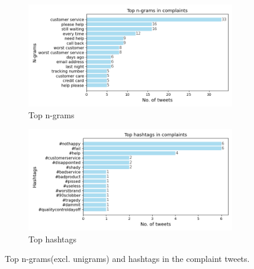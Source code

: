 \begin{figure}[htbp]
    \centering
    \captionsetup{font=small}
    \begin{subfigure}{0.49\textwidth}
        \centering
        \includegraphics[width=\linewidth]{figures/top_ngram_horiz_bar.png}
        \caption{Top n-grams}
        \label{fig: domain_dist_pct}
    \end{subfigure}
    \hfill
    \begin{subfigure}{0.49\textwidth}
        \centering
        \includegraphics[width=\linewidth]{figures/top_hash_horiz_bar.png}
        \caption{Top hashtags}
        \label{fig: domain_dist_count}
    \end{subfigure}
    \caption{Top n-grams(excl. unigrams) and hashtags in the complaint tweets.}
    \label{fig: compl_main_dist}
\end{figure}


